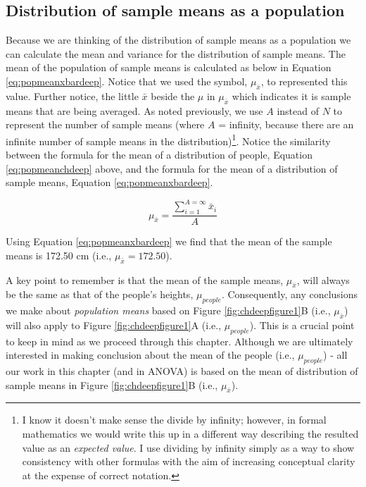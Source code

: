 \documentclass[
]{krantz}
\begin{document}
\hypertarget{distribution-of-sample-means-as-a-population}{%
\subsection{Distribution of sample means as a population}\label{distribution-of-sample-means-as-a-population}}

Because we are thinking of the distribution of sample means as a population we can calculate the mean and variance for the distribution of sample means. The mean of the population of sample means is calculated as below in Equation \eqref{eq:popmeanxbardeep}. Notice that we used the symbol, \(\mu_{\bar{x}}\), to represented this value. Further notice, the little \(\bar{x}\) beside the \(\mu\) in \(\mu_{\bar{x}}\) which indicates it is sample means that are being averaged. As noted previously, we use \(A\) instead of \(N\) to represent the number of sample means (where \(A\) = infinity, because there are an infinite number of sample means in the distribution)\footnote{I know it doesn't make sense the divide by infinity; however, in formal mathematics we would write this up in a different way describing the resulted value as an \emph{expected value}. I use dividing by infinity simply as a way to show consistency with other formulas with the aim of increasing conceptual clarity at the expense of correct notation.}. Notice the similarity between the formula for the mean of a distribution of people, Equation \eqref{eq:popmeanchdeep} above, and the formula for the mean of a distribution of sample means, Equation \eqref{eq:popmeanxbardeep}.

\begin{equation} 
\mu_{\bar{x}} = \frac{\sum_{i=1}^{A=\infty}{\bar{x}_i}}{A}
      \label{eq:popmeanxbardeep}
\end{equation}

Using Equation \eqref{eq:popmeanxbardeep} we find that the mean of the sample means is 172.50 cm (i.e., \(\mu_{\bar{x}} = 172.50\)).

A key point to remember is that the mean of the sample means, \(\mu_{\bar{x}}\), will always be the same as that of the people's heights, \(\mu_{people}\). Consequently, any conclusions we make about \emph{population means} based on Figure \ref{fig:chdeepfigure1}B (i.e., \(\mu_{\bar{x}}\)) will also apply to Figure \ref{fig:chdeepfigure1}A (i.e., \(\mu_{people}\)). This is a crucial point to keep in mind as we proceed through this chapter. Although we are ultimately interested in making conclusion about the mean of the people (i.e., \(\mu_{people}\)) - all our work in this chapter (and in ANOVA) is based on the mean of distribution of sample means in Figure \ref{fig:chdeepfigure1}B (i.e., \(\mu_{\bar{x}}\)).
\end{document}
